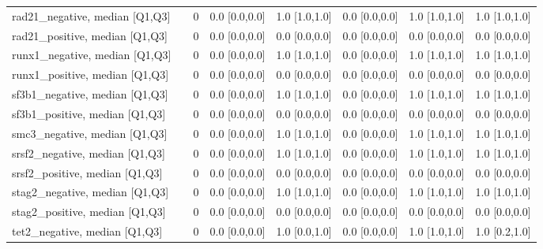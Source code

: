 \begin{tabular}{llllllll}
rad21\_negative, median [Q1,Q3] &    &                    0 &     0.0 [0.0,0.0] &           1.0 [1.0,1.0] &     0.0 [0.0,0.0] &             1.0 [1.0,1.0] &             1.0 [1.0,1.0] \\
rad21\_positive, median [Q1,Q3] &    &                    0 &     0.0 [0.0,0.0] &           0.0 [0.0,0.0] &     0.0 [0.0,0.0] &             0.0 [0.0,0.0] &             0.0 [0.0,0.0] \\
runx1\_negative, median [Q1,Q3] &    &                    0 &     0.0 [0.0,0.0] &           1.0 [1.0,1.0] &     0.0 [0.0,0.0] &             1.0 [1.0,1.0] &             1.0 [1.0,1.0] \\
runx1\_positive, median [Q1,Q3] &    &                    0 &     0.0 [0.0,0.0] &           0.0 [0.0,0.0] &     0.0 [0.0,0.0] &             0.0 [0.0,0.0] &             0.0 [0.0,0.0] \\
sf3b1\_negative, median [Q1,Q3] &    &                    0 &     0.0 [0.0,0.0] &           1.0 [1.0,1.0] &     0.0 [0.0,0.0] &             1.0 [1.0,1.0] &             1.0 [1.0,1.0] \\
sf3b1\_positive, median [Q1,Q3] &    &                    0 &     0.0 [0.0,0.0] &           0.0 [0.0,0.0] &     0.0 [0.0,0.0] &             0.0 [0.0,0.0] &             0.0 [0.0,0.0] \\
smc3\_negative, median [Q1,Q3] &    &                    0 &     0.0 [0.0,0.0] &           1.0 [1.0,1.0] &     0.0 [0.0,0.0] &             1.0 [1.0,1.0] &             1.0 [1.0,1.0] \\
srsf2\_negative, median [Q1,Q3] &    &                    0 &     0.0 [0.0,0.0] &           1.0 [1.0,1.0] &     0.0 [0.0,0.0] &             1.0 [1.0,1.0] &             1.0 [1.0,1.0] \\
srsf2\_positive, median [Q1,Q3] &    &                    0 &     0.0 [0.0,0.0] &           0.0 [0.0,0.0] &     0.0 [0.0,0.0] &             0.0 [0.0,0.0] &             0.0 [0.0,0.0] \\
stag2\_negative, median [Q1,Q3] &    &                    0 &     0.0 [0.0,0.0] &           1.0 [1.0,1.0] &     0.0 [0.0,0.0] &             1.0 [1.0,1.0] &             1.0 [1.0,1.0] \\
stag2\_positive, median [Q1,Q3] &    &                    0 &     0.0 [0.0,0.0] &           0.0 [0.0,0.0] &     0.0 [0.0,0.0] &             0.0 [0.0,0.0] &             0.0 [0.0,0.0] \\
tet2\_negative, median [Q1,Q3] &    &                    0 &     0.0 [0.0,0.0] &           1.0 [0.0,1.0] &     0.0 [0.0,0.0] &             1.0 [1.0,1.0] &             1.0 [0.2,1.0] \\

\end{tabular}
